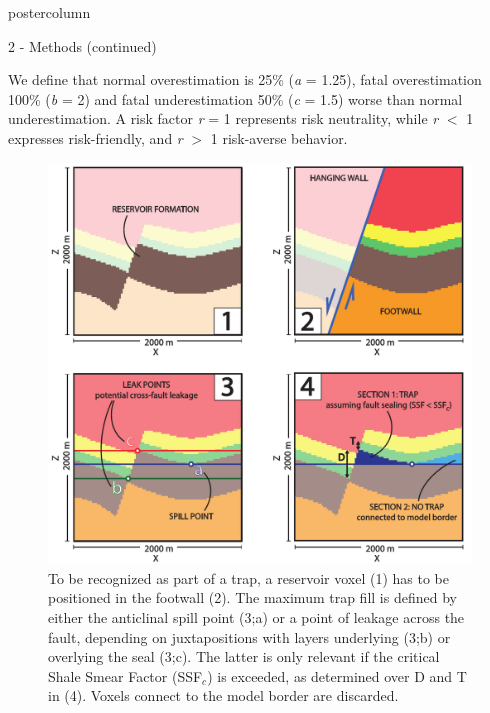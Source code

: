 \documentclass{beamer}
\begin{document}
\begin{frame}
\begin{columns}
\begin{column}{.499\textwidth}
\begin{beamercolorbox}[center]{postercolumn}
\begin{minipage}{.98\textwidth}
{\begin{myblock}{2 - Methods (continued)}
\begin{minipage}[h]{0.6\textwidth}
								We define that normal overestimation is 25\% (\textit{a} = 1.25), fatal overestimation 100\% (\textit{b} = 2) and fatal underestimation 50\% (\textit{c} = 1.5) worse than normal underestimation. A risk factor \textit{r} = 1 represents risk neutrality, while \textit{r} $<$ 1 expresses risk-friendly, and \textit{r} $>$ 1 risk-averse behavior.
								
								\end{minipage}\hspace{0.005\textwidth}
								\begin{minipage}{0.39\textwidth}
								\begin{figure}
									\centering\includegraphics[width=1\textwidth]{figures/Trap_Cond_H.pdf}
									\caption{To be recognized as part of a trap, a reservoir voxel (1) has
									to be positioned in the	footwall (2). The maximum trap fill is defined by either the anticlinal spill point (3;a) or a point of leakage across the fault, depending on juxtapositions with layers
									underlying (3;b) or overlying the seal (3;c). The latter is only relevant if the
									critical Shale Smear Factor (SSF$_c$) is exceeded, as determined over D and T in (4). Voxels connect to the model border are discarded.}
									\label{fig:trap_cond}
								\end{figure}

\end{minipage}
\end{myblock}}
\end{minipage}
\end{beamercolorbox}
\end{column}
\end{columns}
\end{frame}
\end{document}
